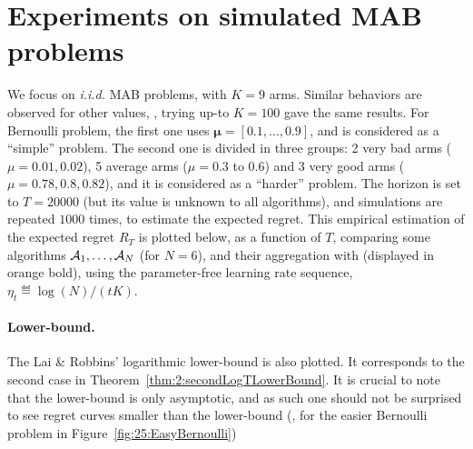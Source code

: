 \section{Experiments on simulated MAB problems}\label{sub:25:numExp}





We focus on \emph{i.i.d.} MAB problems, with $K = 9$ arms.
Similar behaviors are observed for other values, \eg, trying up-to $K = 100$ gave the same results.
For Bernoulli problem, the first one uses $\boldsymbol{\mu}=[0.1,\dots,0.9]$, and is considered as a ``simple'' problem.
The second one is divided in three groups:
2 very bad arms ($\mu = 0.01, 0.02$), 5 average arms ($\mu = 0.3$ to $0.6$) and 3 very good arms ($\mu = 0.78, 0.8, 0.82$), and it is considered as a ``harder'' problem.
The horizon is set to $T = 20000$ (but its value is unknown to all algorithms), and simulations are repeated $1000$ times, to estimate the expected regret.
%
This empirical estimation of the expected regret $R_T$ is plotted below,
as a function of $T$, comparing some algorithms $\mathcal{A}_1,\dots,\mathcal{A}_N$ (for $N=6$), and their aggregation with \Aggr{} (displayed in orange bold),
using the parameter-free learning rate sequence, $\eta_t \eqdef \log(N) / (t K)$.

\paragraph{Lower-bound.}
%
The Lai \& Robbins' logarithmic lower-bound \cite{LaiRobbins85} is also plotted. It corresponds to the second case in Theorem~\ref{thm:2:secondLogTLowerBound}. It is crucial to note that the lower-bound is only asymptotic, and as such one should not be surprised to see regret curves smaller than the lower-bound (\eg, for the easier Bernoulli problem in Figure~\ref{fig:25:EasyBernoulli})



